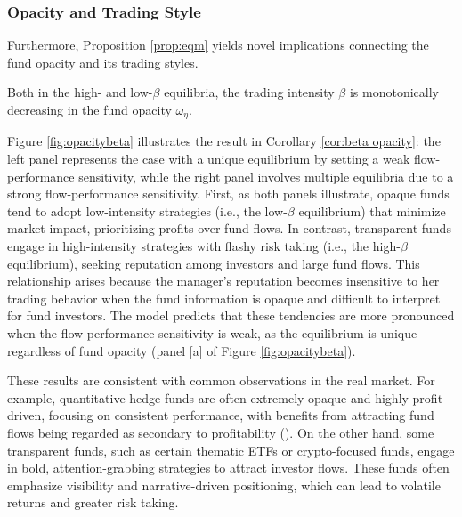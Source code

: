 \subsubsection{Opacity and Trading Style}
Furthermore, Proposition \ref{prop:eqm} yields novel implications connecting the fund opacity and its trading styles.
\begin{corollary}\label{cor:beta opacity}
    Both in the high- and low-$\beta$ equilibria, the trading intensity $\beta$ is monotonically decreasing in the fund opacity $\omega_{\eta}$.
\end{corollary}
Figure \ref{fig:opacitybeta} illustrates the result in Corollary \ref{cor:beta opacity}: the left panel represents the case with a unique equilibrium by setting a weak flow-performance sensitivity, while the right panel involves multiple equilibria due to a strong flow-performance sensitivity.
First, as both panels illustrate, opaque funds tend to adopt low-intensity strategies (i.e., the low-$\beta$ equilibrium) that minimize market impact, prioritizing profits over fund flows. In contrast, transparent funds engage in high-intensity strategies with flashy risk taking (i.e., the high-$\beta$ equilibrium), seeking reputation among investors and large fund flows. This relationship arises because the manager's reputation becomes insensitive to her trading behavior when the fund information is opaque and difficult to interpret for fund investors. The model predicts that these tendencies are more pronounced when the flow-performance sensitivity is weak, as the equilibrium is unique regardless of fund opacity (panel [a] of Figure \ref{fig:opacitybeta}).



These results are consistent with common observations in the real market. For example, quantitative hedge funds are often extremely opaque and highly profit-driven, focusing on consistent performance, with benefits from attracting fund flows being regarded as secondary to profitability (\citealp{schwager2012hedge}). On the other hand, some transparent funds, such as certain thematic ETFs or crypto-focused funds, engage in bold, attention-grabbing strategies to attract investor flows. These funds often emphasize visibility and narrative-driven positioning, which can lead to volatile returns and greater risk taking.



